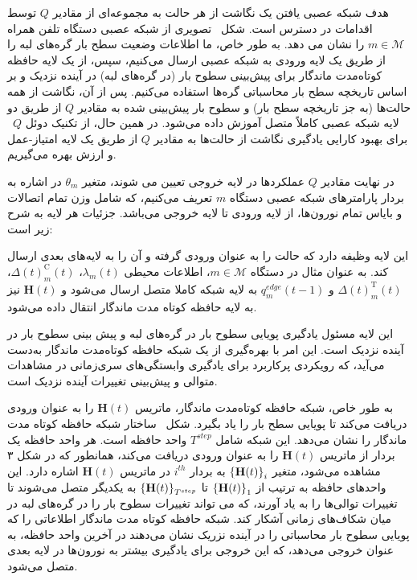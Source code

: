 
هدف شبکه عصبی یافتن یک نگاشت از هر حالت به مجموعه‌ای از مقادیر $Q$ توسط اقدامات در دسترس است. شکل~ تصویری از شبکه عصبی دستگاه تلفن همراه $m \in \mathcal{M}$ را نشان می دهد. به طور خاص، ما اطلاعات وضعیت سطح بار گره‌های لبه را از طریق یک لایه ورودی به شبکه عصبی ارسال می‌کنیم،
سپس، از یک لایه حافظه کوتاه‌مدت ماندگار برای پیش‌بینی سطوح بار (در گره‌های لبه) در آینده نزدیک و بر اساس تاریخچه سطح بار محاسباتی گره‌ها استفاده می‌کنیم. پس از آن، نگاشت از همه حالت‌ها (به جز تاریخچه سطح بار) و سطوح بار پیش‌بینی شده به مقادیر $Q$ از طریق دو لایه شبکه عصبی کاملاً متصل آموزش داده می‌شود. در همین حال، از تکنیک دوئل $Q$~\cite{wang2016dueling} برای بهبود کارایی یادگیری نگاشت از حالت‌ها به مقادیر $Q$ از طریق یک لایه امتیاز-عمل و ارزش بهره می‌گیریم. 

در نهایت مقادیر $Q$ عملکردها در لایه خروجی تعیین می شوند، متغیر $\theta_m$ در اشاره به بردار پارامترهای شبکه عصبی دستگاه $m$ تعریف می‌کنیم، که شامل وزن تمام اتصالات و بایاس تمام نورون‌ها، از لایه ورودی تا لایه خروجی می‌باشد. جزئیات هر لایه به شرح زیر است:






این لایه وظیفه دارد که حالت را به عنوان ورودی گرفته و آن را به لایه‌های بعدی ارسال کند. به عنوان مثال در دستگاه $m \in \mathcal{M}$، اطلاعات محیطی $\lambda_m(t)$، $\Delta(t)_m^{\text{C}}(t)$، $\Delta(t)_m^{\text{T}}(t)$ و $q_m^{edge}(t-1)$ به لایه شبکه کاملا متصل ارسال می‌شود و $\textbf{H}(t)$ نیز به لایه حافظه کوتاه مدت ماندگار انتقال داده می‌شود.  


این لایه مسئول یادگیری پویایی سطوح بار در گره‌های لبه و پیش بینی سطوح بار در آینده نزدیک است. این امر با بهره‌گیری از یک شبکه حافظه کوتاه‌مدت ماندگار به‌دست می‌آید، که رویکردی پرکاربرد برای یادگیری وابستگی‌های سری‌زمانی در مشاهدات متوالی و پیش‌بینی تغییرات آینده نزدیک است. 

به طور خاص، شبکه حافظه کوتاه‌مدت ماندگار، ماتریس $\textbf{H}(t)$ را به عنوان ورودی دریافت می‌کند تا پویایی سطح بار را یاد بگیرد. شکل~ ساختار شبکه حافظه کوتاه مدت ماندگار را نشان می‌دهد. این شبکه شامل $T^{step}$ واحد حافظه است. هر واحد حافظه یک بردار از ماتریس $\textbf{H}(t)$ را به عنوان ورودی دریافت می‌کند، همانطور که در شکل ۳ مشاهده می‌شود، متغیر $\left\{ \textbf{H}(t) \right\}_i$ به بردار $i^{th}$ در ماتریس $\textbf{H}(t)$ اشاره دارد. این واحدهای حافظه به ترتیب از $\left\{ \textbf{H}(t) \right\}_1$ تا $\left\{ \textbf{H}(t) \right\}_{T^{step}}$ به یکدیگر متصل می‌شوند تا تغییرات توالی‌ها را به یاد آورند، که می تواند تغییرات سطوح بار را در گره‌های لبه در میان شکاف‌های زمانی آشکار کند. شبکه حافظه کوتاه مدت ماندگار اطلاعاتی را که پویایی سطوح بار محاسباتی را در آینده نزریک نشان می‌دهند در آخرین واحد حافظه، به عنوان خروجی می‌دهد، که این خروجی برای یادگیری بیشتر به نورون‌ها در لایه بعدی متصل می‌شود.



